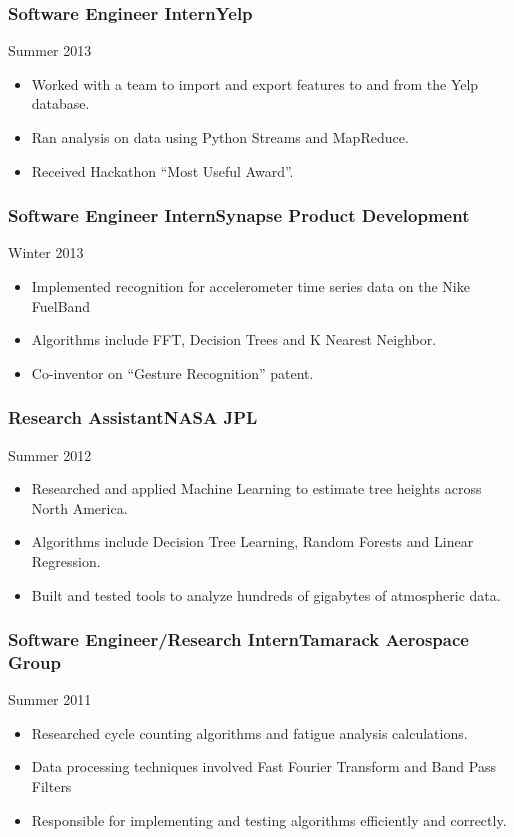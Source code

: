 \documentclass[9pt]{article}
\newenvironment{changemargin}[2]{%
  \begin{list}{}{%
    \setlength{\topsep}{0pt}%
    \setlength{\leftmargin}{#1}%
    \setlength{\rightmargin}{#2}%
    \setlength{\listparindent}{\parindent}%
    \setlength{\itemindent}{\parindent}%
    \setlength{\parsep}{\parskip}%
  }%
  \item[]}{\end{list}
}
\newenvironment{body} {
    \vspace*{-16pt}
    \begin{changemargin}{-0.20in}{-0.5in}
  }
    {\end{changemargin}
}
\newenvironment{jobdescriptionlist}[3]{
  \subsubsection*{#1\hfill\small#2}
  \small
  \vspace*{-5pt}
  {\hfill #3}
  \vspace*{-10pt}
  \begin{itemize}
   \setlength{\topsep}{0pt}
   \setlength{\itemsep}{1pt}
   \setlength{\parskip}{0pt}
   \setlength{\parsep}{0pt}
}{\end{itemize}\vspace*{-3pt}\normalsize}
\begin{document}
\begin{body}
    \begin{jobdescriptionlist}{Software Engineer Intern}{Yelp}{Summer 2013}
        \item Worked with a team to import and export features to and from the Yelp database.
        \item Ran analysis on data using Python Streams and MapReduce.
        \item Received Hackathon ``Most Useful Award''.
    \end{jobdescriptionlist}

    \begin{jobdescriptionlist}{Software Engineer Intern}{Synapse Product Development}{Winter 2013}
        \item Implemented recognition for accelerometer time series data on the Nike FuelBand
        \item Algorithms include FFT, Decision Trees and K Nearest Neighbor.
        \item Co-inventor on ``Gesture Recognition'' patent.
    \end{jobdescriptionlist}

    \begin{jobdescriptionlist}{Research Assistant}{NASA JPL}{Summer 2012}
        \item Researched and applied Machine Learning to estimate tree heights across North America.
        \item Algorithms include Decision Tree Learning, Random Forests and Linear Regression.
        \item Built and tested tools to analyze hundreds of gigabytes of atmospheric data.
    \end{jobdescriptionlist}

    \begin{jobdescriptionlist}{Software Engineer/Research Intern}{Tamarack Aerospace Group}{Summer 2011}
        \item Researched cycle counting algorithms and fatigue analysis calculations.
        \item Data processing techniques involved Fast Fourier Transform and Band Pass Filters
        \item Responsible for implementing and testing algorithms efficiently and correctly.
    \end{jobdescriptionlist}



\end{body}
\end{document}
